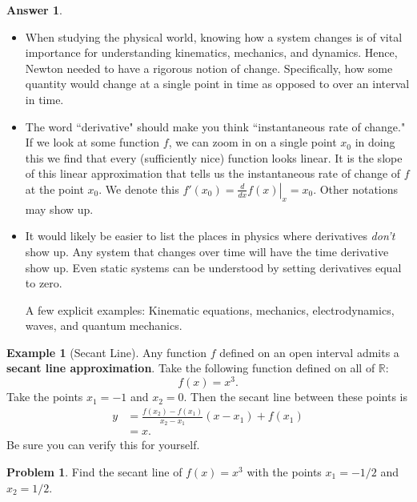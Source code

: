 \documentclass[12pt]{article}
\newcommand{\R}{\mathbb{R}}
\theoremstyle{definition}
\newtheorem{example}{Example}[section]
\newtheorem{problem}{Problem}[section]
\newtheorem{answer}{Answer}[section]
\begin{document}
\begin{answer}~
\begin{itemize}
    \item When studying the physical world, knowing how a system changes is of vital importance for understanding kinematics, mechanics, and dynamics.  Hence, Newton needed to have a rigorous notion of change. Specifically, how some quantity would change at a single point in time as opposed to over an interval in time.
    \item The word ``derivative" should make you think ``instantaneous rate of change."  If we look at some function $f$, we can zoom in on a single point $x_0$ in doing this we find that every (sufficiently nice) function looks linear.  It is the slope of this linear approximation that tells us the instantaneous rate of change of $f$ at the point $x_0$. We denote this $f'(x_0)=\left. \frac{d}{dx}f(x) \right|_x=x_0$.  Other notations may show up.
    \item It would likely be easier to list the places in physics where derivatives \emph{don't} show up.  Any system that changes over time will have the time derivative show up. Even static systems can be understood by setting derivatives equal to zero.
    
    A few explicit examples: Kinematic equations, mechanics, electrodynamics, waves, and quantum mechanics.
\end{itemize}
\end{answer}

\begin{example}[Secant Line]
Any function $f$ defined on an open interval admits a \textbf{secant line approximation}.  Take the following function defined on all of $\R$:
\[
f(x)=x^3.
\]
Take the points $x_1=-1$ and $x_2=0$. Then the secant line between these points is
\begin{align*}
y&=\frac{f(x_2)-f(x_1)}{x_2-x_1}(x-x_1)+f(x_1)\\
&=x.
\end{align*}
Be sure you can verify this for yourself.
\end{example}

\begin{problem}
Find the secant line of $f(x)=x^3$ with the points $x_1=-1/2$ and $x_2=1/2$.
\end{problem}
\end{document}
